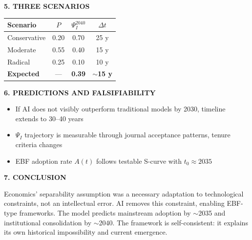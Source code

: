\begin{tcolorbox}[colback=blue!3!white, colframe=blue!75!black,
    title=\textbf{PAPER: The AI-Driven Transformation of Economic Science: A Formal Model}]
\textbf{5. THREE SCENARIOS}

\begin{center}
\small
\begin{tabular}{lccc}
\toprule
Scenario & $P$ & $\Psi_I^{2040}$ & $\Delta t$ \\
\midrule
Conservative & 0.20 & 0.70 & 25 y \\
Moderate & 0.55 & 0.40 & 15 y \\
Radical & 0.25 & 0.10 & 10 y \\
\midrule
\textbf{Expected} & --- & \textbf{0.39} & \textbf{$\sim$15 y} \\
\bottomrule
\end{tabular}
\end{center}

\textbf{6. PREDICTIONS AND FALSIFIABILITY}

\begin{itemize}[nosep]
\item If AI does not visibly outperform traditional models by 2030, timeline extends to 30--40 years
\item $\Psi_I$ trajectory is measurable through journal acceptance patterns, tenure criteria changes
\item EBF adoption rate $A(t)$ follows testable S-curve with $t_0 \approx 2035$
\end{itemize}

\textbf{7. CONCLUSION}

Economics' separability assumption was a necessary adaptation to technological constraints,
not an intellectual error. AI removes this constraint, enabling EBF-type frameworks.
The model predicts mainstream adoption by $\sim$2035 and institutional consolidation by $\sim$2040.
The framework is self-consistent: it explains its own historical impossibility and current emergence.

\end{tcolorbox}



